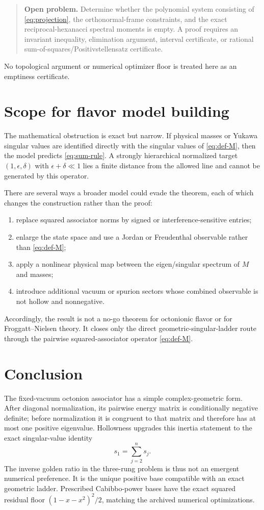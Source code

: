 \documentclass[11pt]{article}
\theoremstyle{remark}
\begin{document}
\begin{quote}
\textbf{Open problem.} Determine whether the polynomial system consisting of \eqref{eq:projection}, the orthonormal-frame constraints, and the exact reciprocal-hexanacci spectral moments is empty.  A proof requires an invariant inequality, elimination argument, interval certificate, or rational sum-of-squares/Positivstellensatz certificate.
\end{quote}

No topological argument or numerical optimizer floor is treated here as an emptiness certificate.

\section{Scope for flavor model building}

The mathematical obstruction is exact but narrow.  If physical masses or Yukawa singular values are identified directly with the singular values of \eqref{eq:def-M}, then the model predicts \eqref{eq:sum-rule}.  A strongly hierarchical normalized target $(1,\epsilon,\delta)$ with $\epsilon+\delta\ll1$ lies a finite distance from the allowed line and cannot be generated by this operator.

There are several ways a broader model could evade the theorem, each of which changes the construction rather than the proof:
\begin{enumerate}
 \item replace squared associator norms by signed or interference-sensitive entries;
 \item enlarge the state space and use a Jordan or Freudenthal observable rather than \eqref{eq:def-M};
 \item apply a nonlinear physical map between the eigen/singular spectrum of $M$ and masses;
 \item introduce additional vacuum or spurion sectors whose combined observable is not hollow and nonnegative.
\end{enumerate}
Accordingly, the result is not a no-go theorem for octonionic flavor or for Froggatt--Nielsen theory.  It closes only the direct geometric-singular-ladder route through the pairwise squared-associator operator \eqref{eq:def-M}.

\section{Conclusion}

The fixed-vacuum octonion associator has a simple complex-geometric form.  After diagonal normalization, its pairwise energy matrix is conditionally negative definite; before normalization it is congruent to that matrix and therefore has at most one positive eigenvalue.  Hollowness upgrades this inertia statement to the exact singular-value identity
\[
 s_1=\sum_{j=2}^n s_j.
\]
The inverse golden ratio in the three-rung problem is thus not an emergent numerical preference.  It is the unique positive base compatible with an exact geometric ladder.  Prescribed Cabibbo-power bases have the exact squared residual floor $(1-x-x^2)^2/2$, matching the archived numerical optimizations.
\end{document}
